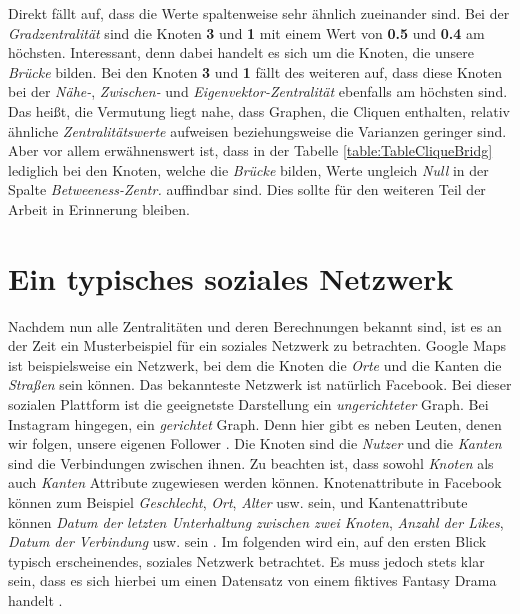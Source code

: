 Direkt fällt auf, dass die Werte spaltenweise sehr ähnlich zueinander sind. Bei der \textit{Gradzentralität} sind die Knoten \textbf{3} und \textbf{1} mit einem Wert von \textbf{0.5} und \textbf{0.4} am höchsten. Interessant, denn dabei handelt es sich um die Knoten, die unsere \textit{Brücke} bilden. Bei den Knoten \textbf{3} und \textbf{1} fällt des weiteren auf, dass diese Knoten bei der \textit{Nähe-}, \textit{Zwischen-} und \textit{Eigenvektor-Zentralität} ebenfalls am höchsten sind. Das heißt, die Vermutung liegt nahe, dass Graphen, die Cliquen enthalten, relativ ähnliche \textit{Zentralitätswerte} aufweisen beziehungsweise die Varianzen geringer sind. Aber vor allem erwähnenswert ist, dass in der Tabelle \ref{table:TableCliqueBridg} lediglich bei den Knoten, welche die \textit{Brücke} bilden, Werte ungleich \textit{Null} in der Spalte \textit{Betweeness-Zentr.} auffindbar sind. Dies sollte für den weiteren Teil der Arbeit in Erinnerung bleiben. 

\newpage
\section{Ein typisches soziales Netzwerk}
Nachdem nun alle Zentralitäten und deren Berechnungen bekannt sind, ist es an der Zeit ein Musterbeispiel für ein soziales Netzwerk zu betrachten. Google Maps ist beispielsweise ein Netzwerk, bei dem die Knoten die \textit{Orte} und die Kanten die \textit{Straßen} sein können. Das bekannteste Netzwerk ist natürlich Facebook. Bei dieser sozialen Plattform ist die geeignetste Darstellung ein \textit{ungerichteter} Graph. Bei Instagram hingegen, ein \textit{gerichtet} Graph. Denn hier gibt es neben Leuten, denen wir folgen, unsere eigenen Follower \cite{fbInsta}. Die Knoten sind die \textit{Nutzer} und die \textit{Kanten} sind die Verbindungen zwischen ihnen. Zu beachten ist, dass sowohl \textit{Knoten} als auch \textit{Kanten} Attribute zugewiesen werden können. Knotenattribute in Facebook können zum Beispiel \textit{Geschlecht}, \textit{Ort}, \textit{Alter} usw. sein, und Kantenattribute können \textit{Datum der letzten Unterhaltung zwischen zwei Knoten}, \textit{Anzahl der Likes}, \textit{Datum der Verbindung} usw. sein \cite{GOT}.
Im folgenden wird ein, auf den ersten Blick typisch erscheinendes, soziales Netzwerk betrachtet. Es muss jedoch stets klar sein, dass es sich hierbei um einen Datensatz von einem fiktives Fantasy Drama handelt \cite{GOT}.

